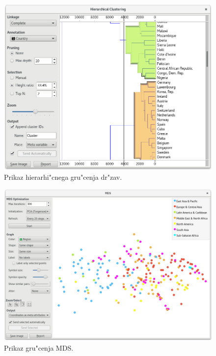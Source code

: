 \begin{figure}
\begin{center}
\includegraphics[width=13.75cm]{pic/clustering_hierarchial_countries.png}
\end{center}
\caption{Prikaz hierarhi"cnega gru"cenja dr"zav.}
\label{clustering_hierarchial_countries}
\end{figure} 

\begin{figure}
\begin{center}
\includegraphics[width=13.75cm]{pic/clustering_mds.png}
\end{center}
\caption{Prikaz gru"cenja MDS.}
\label{clustering_mds}
\end{figure} 

